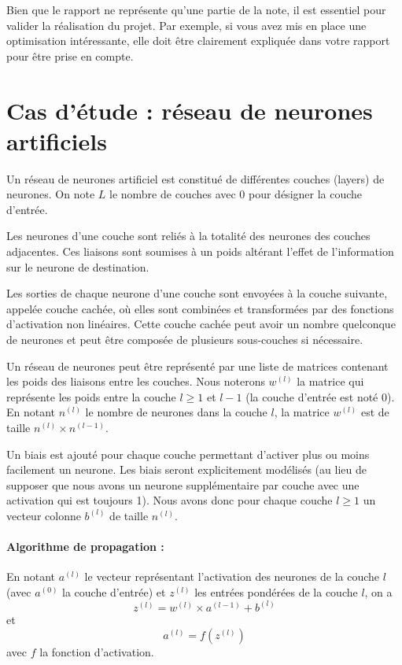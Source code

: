 \documentclass[11pt]{paper}
\begin{document}
Bien que le rapport ne représente qu’une partie de la note, il est essentiel pour valider la réalisation du projet. Par exemple, si vous avez mis en place une optimisation intéressante, elle doit être clairement expliquée dans votre rapport pour être prise en compte.


  \section*{Cas d'étude : réseau de neurones artificiels}

Un réseau de neurones artificiel est constitué de différentes couches (layers) de neurones. On note $L$ le nombre de couches avec 0 pour désigner la couche d'entrée.

Les neurones d'une couche sont reliés à la totalité des neurones des couches adjacentes. Ces liaisons sont soumises à un poids altérant l'effet de l'information sur le neurone de destination.

Les sorties de chaque neurone d'une couche sont envoyées à la couche suivante, appelée couche cachée, où elles sont combinées et transformées par des fonctions d'activation non linéaires. Cette couche cachée peut avoir un nombre quelconque de neurones et peut être composée de plusieurs sous-couches si nécessaire.

Un réseau de neurones peut être représenté par une liste de matrices contenant les poids des liaisons entre les couches. Nous noterons $w^{(l)}$ la matrice qui représente les poids entre la couche $l \geq 1$ et $l-1$ (la couche d'entrée est noté 0). En notant $n^{(l)}$ le nombre de neurones dans la couche $l$, la matrice $w^{(l)}$ est de taille $n^{(l)} \times n^{(l-1)}$.

Un biais est ajouté pour chaque couche permettant d'activer plus ou moins facilement un neurone. Les biais seront explicitement modélisés (au lieu de supposer que nous avons un neurone supplémentaire par couche avec une activation qui est toujours 1). Nous avons donc pour chaque couche $l\geq 1$ un vecteur colonne $b^{(l)}$ de taille $n^{(l)}$.

\paragraph{Algorithme de propagation :}

En notant $a^{(l)}$ le vecteur représentant l'activation des neurones de la couche $l$ (avec $a^{(0)}$ la couche d'entrée) et $z^{(l)}$ les entrées pondérées de la couche $l$, on a  $$z^{(l)} = w^{(l)} \times a^{(l-1)} + b^{(l)}$$ et  $$a^{(l)} = f \left (z^{(l)} \right)$$ avec $f$ la fonction d'activation.
\end{document}
